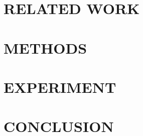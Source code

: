 \documentclass[a4paper,twoside]{article}
\begin{document}
\section{\uppercase{Related Work}}
\label{sec:related_work}


\section{\uppercase{Methods}}
\label{sec:methods}


\section{\uppercase{Experiment}}
\label{sec:experiment}


\section{\uppercase{Conclusion}}
\label{sec:conclusion}



{\small
}


\end{document}
